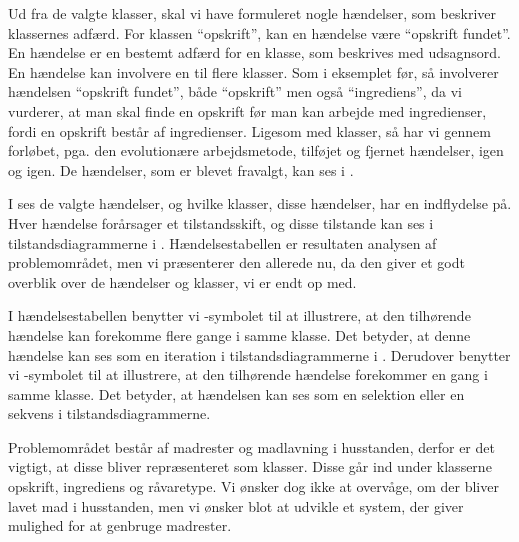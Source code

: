 Ud fra de valgte klasser, skal vi have formuleret nogle hændelser, som beskriver klassernes adfærd. For klassen ``opskrift'', kan en hændelse \fx være ``opskrift fundet''. En hændelse er en bestemt adfærd for en klasse, som beskrives med udsagnsord. En hændelse kan involvere en til flere klasser. Som i eksemplet før, så involverer hændelsen ``opskrift fundet'', både ``opskrift'' men også ``ingrediens'', da vi vurderer, at man skal finde en opskrift før man kan arbejde med ingredienser, fordi en opskrift består af ingredienser. Ligesom med klasser, så har vi gennem forløbet, pga. den evolutionære arbejdsmetode, tilføjet og fjernet hændelser, igen og igen. De hændelser, som er blevet fravalgt, kan ses i .

I  ses de valgte hændelser, og hvilke klasser, disse hændelser, har en indflydelse på. Hver hændelse forårsager et tilstandsskift, og disse tilstande kan ses i tilstandsdiagrammerne i . Hændelsestabellen er resultaten analysen af problemområdet, men vi præsenterer den allerede nu, da den giver et godt overblik over de hændelser og klasser, vi er endt op med. 

I hændelsestabellen benytter vi \iter-symbolet til at illustrere, at den tilhørende hændelse kan forekomme flere gange i samme klasse. Det betyder, at denne hændelse kan ses som en iteration i tilstandsdiagrammerne i . Derudover benytter vi \once-symbolet til at illustrere, at den tilhørende hændelse forekommer en gang i samme klasse. Det betyder, at hændelsen kan ses som en selektion eller en sekvens i tilstandsdiagrammerne.



Problemområdet består af madrester og madlavning i husstanden, derfor er det vigtigt, at disse bliver repræsenteret som klasser. Disse går ind under klasserne opskrift, ingrediens og råvaretype. Vi ønsker dog ikke at overvåge, om der bliver lavet mad i husstanden, men vi ønsker blot at udvikle et system, der giver mulighed for at genbruge madrester.
